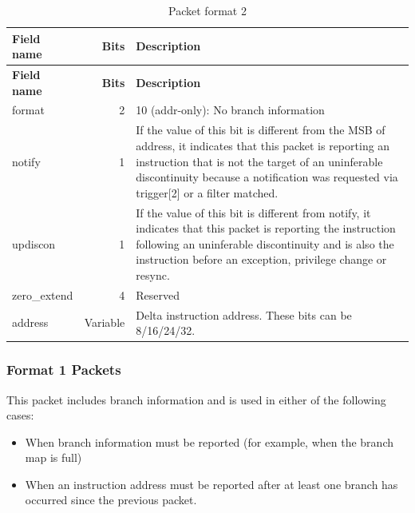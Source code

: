 \documentclass[main\_\_EN.tex]{subfiles}
\begin{document}
\begin{longtable}[c]{ |l|r|L{12.2cm}| }
    \caption{Packet format 2}
    \label{tab:f2}
    \\\hline{}
    \textbf{Field name} & \textbf{Bits} & \textbf{Description} \\\hline
    \endfirsthead
    \hline{}
    \textbf{Field name} & \textbf{Bits} & \textbf{Description} \\\hline
    \endhead
    \endfoot
    \endlastfoot

    format & 2 & 10 (addr-only): No branch information \\\hline
    notify & 1 & If the value of this bit is different from the MSB of address, it indicates that this packet is reporting an instruction that is not the target of an uninferable discontinuity because a notification was requested via trigger[2] or a filter matched. \\\hline
    updiscon & 1 & If the value of this bit is different from notify, it indicates that this packet is reporting the instruction following an uninferable discontinuity and is also the instruction before an exception, privilege change or resync. \\\hline
    zero\_extend & 4 & Reserved \\\hline
    address & Variable & Delta instruction address. These bits can be 8/16/24/32. \\\hline

 \end{longtable}


\subsubsection{Format 1 Packets}

This packet includes branch information and is used in either of the following cases:
\begin{itemize}
    \item When branch information must be reported (for example, when the branch map is full)
    \item When an instruction address must be reported after at least one branch has occurred since the previous packet.
\end{itemize}
\end{document}
